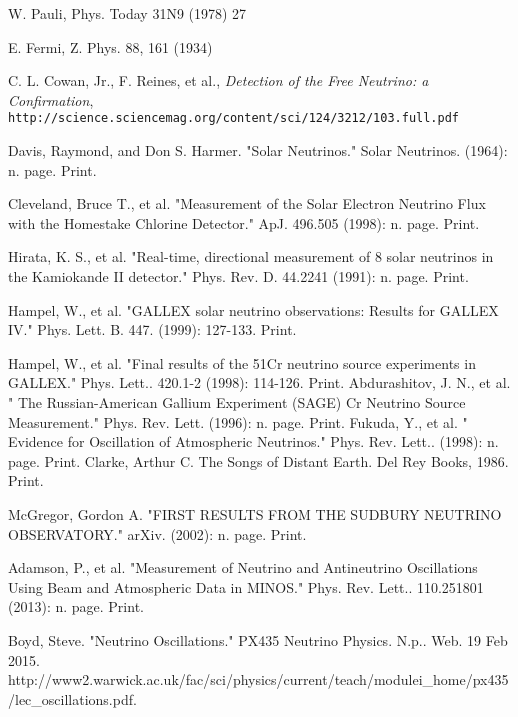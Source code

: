 \documentclass[12pt]{article}
\begin{document}
\newpage
\begin{thebibliography}{20} %
\singlespacing

W. Pauli, Phys. Today 31N9 (1978) 27

E. Fermi, Z. Phys. 88, 161 (1934)

  C. L. Cowan, Jr., F. Reines, et al., \emph{Detection of the Free Neutrino: a Confirmation}, \\
  \texttt{http://science.sciencemag.org/content/sci/124/3212/103.full.pdf}

Davis, Raymond, and Don S. Harmer. "Solar Neutrinos." Solar Neutrinos. (1964): n. page. Print.

Cleveland, Bruce T., et al. "Measurement of the Solar Electron Neutrino Flux with the Homestake Chlorine Detector." ApJ. 496.505 (1998): n. page. Print.

Hirata, K. S., et al. "Real-time, directional measurement of 8 solar neutrinos in the Kamiokande II detector." Phys. Rev. D. 44.2241 (1991): n. page. Print.

Hampel, W., et al. "GALLEX solar neutrino observations: Results for GALLEX IV." Phys. Lett. B. 447. (1999): 127-133. Print.

Hampel, W., et al. "Final results of the 51Cr neutrino source experiments in GALLEX." Phys. Lett.. 420.1-2 (1998): 114-126. Print.
Abdurashitov, J. N., et al. " The Russian-American Gallium Experiment (SAGE) Cr Neutrino Source Measurement."  Phys. Rev. Lett. (1996): n. page. Print.
Fukuda, Y., et al. " Evidence for Oscillation of Atmospheric Neutrinos."  Phys. Rev. Lett.. (1998): n. page. Print.
Clarke, Arthur C. The Songs of Distant Earth. Del Rey Books, 1986. Print.

McGregor, Gordon A. "FIRST RESULTS FROM THE SUDBURY NEUTRINO OBSERVATORY." arXiv. (2002): n. page. Print.

Adamson, P., et al. "Measurement of Neutrino and Antineutrino Oscillations Using Beam and Atmospheric Data in MINOS."  Phys. Rev. Lett.. 110.251801 (2013): n. page. Print.

Boyd, Steve. "Neutrino Oscillations." PX435 Neutrino Physics. N.p.. Web. 19 Feb 2015. http://www2.warwick.ac.uk/fac/sci/physics/current/teach/modulei\_home/px435/lec\_oscillations.pdf.


\end{thebibliography}
\end{document}
